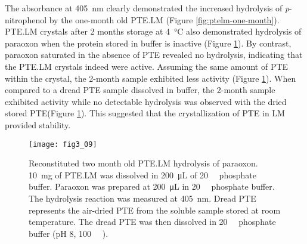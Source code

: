 \begin{refsection}
The absorbance at \SI{405}{\nm} clearly demonstrated the
increased hydrolysis of \emph{p}-nitrophenol by the one-month old PTE.LM
(Figure \ref{fig:ptelm-one-month}). PTE.LM crystals after 2 months
storage at \SI{4}{\celsius} also demonstrated hydrolysis of paraoxon when the
protein stored in buffer is inactive (Figure \ref{fig:ptelm-two-month}). By
contrast, paraoxon saturated in the absence of PTE revealed no hydrolysis,
indicating that the PTE.LM crystals indeed were active. Assuming the same
amount of PTE within the crystal, the 2-month sample exhibited less activity
(Figure \ref{fig:ptelm-two-month}). When compared to a dread PTE sample
dissolved in buffer, the 2-month sample exhibited activity while no detectable
hydrolysis was observed with the dried stored PTE(Figure
\ref{fig:ptelm-two-month}). This suggested that the crystallization of PTE in
LM provided stability.
\begin{figure}[htbp] \centering \texttt{[image: fig3\_09]}
    \caption[Reconstituted two month old PTE.LM hydrolysis of paraoxon.
        \SI{10}{\mg} of PTE.LM was dissolved in \SI{200}{\micro\liter} of
        \SI{20}{\milli\Molar} phosphate buffer. Paraoxon was prepared at
        \SI{200}{\micro\liter} in \SI{20}{\milli\Molar} phosphate buffer. The
        hydrolysis reaction was measured at \SI{405}{\nm}. Dread PTE represents
        the air-dried PTE that was stored at room temperature and dissolved in
        \SI{20}{\milli\Molar} phosphate buffer (pH 8, \SI{100}{\micro\Molar}
    ).] {Reconstituted two month old PTE.LM hydrolysis of paraoxon.
        \SI{10}{\mg} of PTE.LM was dissolved in \SI{200}{\micro\liter} of
        \SI{20}{\milli\Molar} phosphate buffer. Paraoxon was prepared at
        \SI{200}{\micro\liter} in \SI{20}{\milli\Molar} phosphate buffer. The
        hydrolysis reaction was measured at \SI{405}{\nm}.  Dread PTE
        represents the air-dried PTE from the soluble sample stored at room
        temperature. The dread PTE was then dissolved in \SI{20}{\milli\Molar}
        phosphate buffer (pH 8, \SI{100}{\micro\Molar} ).}
    \label{fig:ptelm-two-month} 
\end{figure}


\end{refsection}
